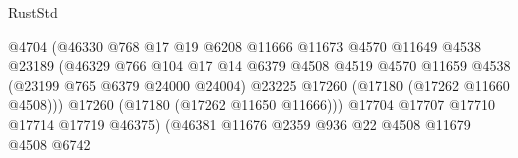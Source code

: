 \begin{lexlean}{RustStd}
\begin{coremodule}
{\begin{coremodule}
{{{{{{{{{{{{{{{{{{{{{{{{{{{{{{{{{{{{{{{{{{{{{{{{{{{{{{{                                                  @4704
                                                  (@46330
                                                    @768
                                                    @17
                                                    @19
                                                    @6208
                                                    @11666
                                                    @11673
                                                    @4570
                                                    @11649
                                                    @4538
                                                    @23189
                                                    (@46329
                                                      @766
                                                      @104
                                                      @17
                                                      @14
                                                      @6379
                                                      @4508
                                                      @4519
                                                      @4570
                                                      @11659
                                                      @4538
                                                      (@23199 @765 @6379 @24000 @24004)
                                                      @23225
                                                      @17260
                                                      (@17180 (@17262 @11660 @4508)))
                                                    @17260
                                                    (@17180 (@17262 @11650 @11666)))
                                                  @17704
                                                  @17707
                                                  @17710
                                                  @17714
                                                  @17719
                                                  @46375)
                                                (@46381
                                                  @11676
                                                  @2359
                                                  @936
                                                  @22
                                                  @4508
                                                  @11679
                                                  @4508
                                                  @6742
}}}}}}}}}}}}}}}}}}}}}}}}}}}}}}}}}}}}}}}}}}}}}}}}}}}}}}}
\end{coremodule}}
\end{coremodule}
\end{lexlean}
